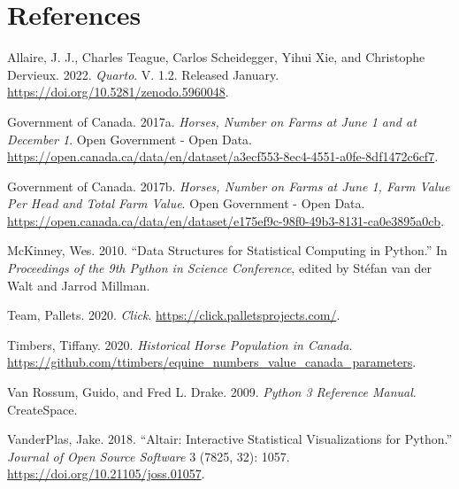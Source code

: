 \documentclass[
  letterpaper,
  DIV=11,
  numbers=noendperiod]{scrartcl}
\newlength{\cslhangindent}
\newenvironment{CSLReferences}[2] %
 {\begin{list}{}{%
  \setlength{\itemindent}{0pt}
  \setlength{\leftmargin}{0pt}
  \setlength{\parsep}{0pt}
  \ifodd #1
   \setlength{\leftmargin}{\cslhangindent}
   \setlength{\itemindent}{-1\cslhangindent}
  \fi
  \setlength{\itemsep}{#2\baselineskip}}}
 {\end{list}}
\begin{document}
\section*{References}\label{references}

\protect{}\label{refs}
\begin{CSLReferences}{1}{1}
Allaire, J. J., Charles Teague, Carlos Scheidegger, Yihui Xie, and
Christophe Dervieux. 2022. \emph{{Quarto}}. V. 1.2. Released January.
\url{https://doi.org/10.5281/zenodo.5960048}.

Government of Canada. 2017a. \emph{Horses, Number on Farms at June 1 and
at December 1}. Open Government - Open Data.
\url{https://open.canada.ca/data/en/dataset/a3ecf553-8ec4-4551-a0fe-8df1472c6cf7}.

Government of Canada. 2017b. \emph{Horses, Number on Farms at June 1,
Farm Value Per Head and Total Farm Value}. Open Government - Open Data.
\url{https://open.canada.ca/data/en/dataset/e175ef9c-98f0-49b3-8131-ca0e3895a0cb}.

McKinney, Wes. 2010. {``Data Structures for Statistical Computing in
Python.''} In \emph{Proceedings of the 9th Python in Science
Conference}, edited by Stéfan van der Walt and Jarrod Millman.

Team, Pallets. 2020. \emph{Click}.
\url{https://click.palletsprojects.com/}.

Timbers, Tiffany. 2020. \emph{Historical Horse Population in Canada}.
\url{https://github.com/ttimbers/equine_numbers_value_canada_parameters}.

Van Rossum, Guido, and Fred L. Drake. 2009. \emph{Python 3 Reference
Manual}. CreateSpace.

VanderPlas, Jake. 2018. {``Altair: Interactive Statistical
Visualizations for Python.''} \emph{Journal of Open Source Software} 3
(7825, 32): 1057. \url{https://doi.org/10.21105/joss.01057}.

\end{CSLReferences}
\end{document}
